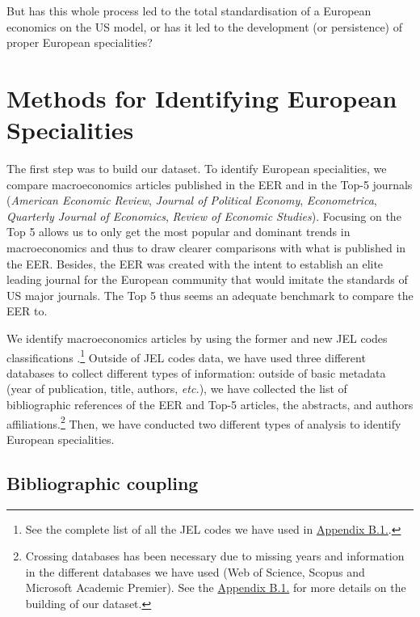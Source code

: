 \documentclass[]{elsarticle} %
\begin{document}
But has this whole process led to the total standardisation of a
European economics on the US model, or has it led to the development (or
persistence) of proper European specialities?

\hypertarget{methods}{%
\section{Methods for Identifying European Specialities}\label{methods}}

The first step was to build our dataset. To identify European
specialities, we compare macroeconomics articles published in the EER
and in the Top-5 journals (\emph{American Economic Review},
\emph{Journal of Political Economy}, \emph{Econometrica},
\emph{Quarterly Journal of Economics}, \emph{Review of Economic
Studies}). Focusing on the Top 5 allows us to only get the most popular
and dominant trends in macroeconomics and thus to draw clearer
comparisons with what is published in the EER. Besides, the EER was
created with the intent to establish an elite leading journal for the
European community that would imitate the standards of US major
journals. The Top 5 thus seems an adequate benchmark to compare the EER
to.

We identify macroeconomics articles by using the former and new JEL
codes classifications \citep{jel1991}.\footnote{See the complete list of
  all the JEL codes we have used in
  \protect\hyperlink{eer-top5-macro}{Appendix B.1.}.} Outside of JEL
codes data, we have used three different databases to collect different
types of information: outside of basic metadata (year of publication,
title, authors, \emph{etc.}), we have collected the list of
bibliographic references of the EER and Top-5 articles, the abstracts,
and authors affiliations.\footnote{Crossing databases has been necessary
  due to missing years and information in the different databases we
  have used (Web of Science, Scopus and Microsoft Academic Premier). See
  the \protect\hyperlink{corpus}{Appendix B.1.} for more details on the
  building of our dataset.} Then, we have conducted two different types
of analysis to identify European specialities.

\hypertarget{bibliographic-coupling}{%
\subsection{Bibliographic coupling}\label{bibliographic-coupling}}
\end{document}
